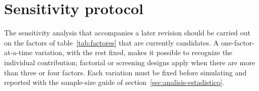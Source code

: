 \section{Sensitivity protocol}
\label{sec:sensibilidad}

The sensitivity analysis that accompanies a later revision should be carried out on the factors of table~\ref{tab:factores} that are currently candidates. A one-factor-at-a-time variation, with the rest fixed, makes it possible to recognize the individual contribution; factorial or screening designs \cite{morris1991factorial,saltelli2010variance} apply when there are more than three or four factors. Each variation must be fixed before simulating and reported with the sample-size guide of section~\ref{sec:analisis-estadistico}.

